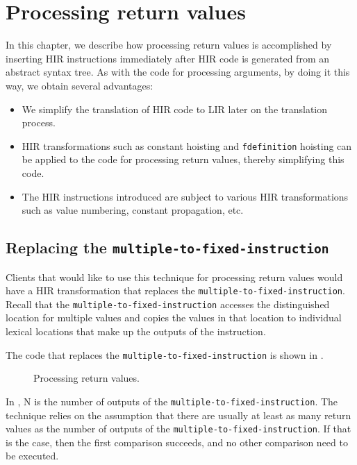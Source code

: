 \chapter{Processing return values}

In this chapter, we describe how processing return values is
accomplished by inserting HIR instructions immediately after HIR code
is generated from an abstract syntax tree.  As with the code for
processing arguments, by doing it this way, we obtain several
advantages:

\begin{itemize}
\item We simplify the translation of HIR code to LIR later on the
  translation process.
\item HIR transformations such as constant hoisting and
  \texttt{fdefinition} hoisting can be applied to the code for
  processing return values, thereby simplifying this code.
\item The HIR instructions introduced are subject to various HIR
  transformations such as value numbering, constant propagation,
  etc.
\end{itemize}

\section{Replacing the \texttt{multiple-to-fixed-instruction}}

Clients that would like to use this technique for processing return
values would have a HIR transformation that replaces the
\texttt{multiple-to-fixed-instruction}.  Recall that the
\texttt{multiple-to-fixed-instruction} accesses the distinguished
location for multiple values and copies the values in that location to
individual lexical locations that make up the outputs of the
instruction.

The code that replaces the \texttt{multiple-to-fixed-instruction} is
shown in .

\begin{figure}
\begin{center}
\end{center}
\caption{\label{fig-process-values}
Processing return values.}
\end{figure}

In , N is the number of outputs of the
\texttt{multiple-to-fixed-instruction}.  The technique relies on the
assumption that there are usually at least as many return values as
the number of outputs of the \texttt{multiple-to-fixed-instruction}.
If that is the case, then the first comparison succeeds, and no other
comparison need to be executed.

